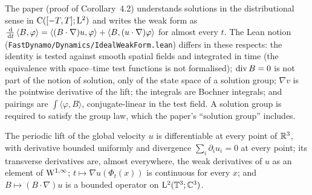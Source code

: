 The paper (proof of Corollary~4.2) understands solutions in the distributional sense in
$\mathrm{C}([-T,T];\mathrm{L}^2)$ and writes the weak form as
$\frac{\,\mathrm{d}}{\,\mathrm{d} t}\left\langle B,\varphi\right\rangle=\left\langle(B\cdot\nabla)u,\varphi\right\rangle+\left\langle B,(u\cdot\nabla)\varphi\right\rangle$
for almost every $t$.  The Lean notion (\texttt{FastDynamo/Dynamics/IdealWeakForm.lean})
differs in these respects: the identity is tested against smooth spatial fields and integrated
in time (the equivalence with space--time test functions is not formalised); $\operatorname{div} B=0$ is
not part of the notion of solution, only of the state space of a solution group; $\nabla v$
is the pointwise derivative of the lift; the integrals are Bochner integrals; and pairings are
$\int\langle\varphi,B\rangle$, conjugate-linear in the test field.  A solution group is
required to satisfy the group law, which the paper's ``solution group'' includes.

\begin{lemma}
  \label{lem:dynamics:velocity-gradient}
  \leanok
  The periodic lift of the global velocity $u$ is differentiable at every point of $\mathbb{R}^3$,
  with derivative bounded uniformly and divergence $\sum_i\partial_iu_i=0$ at every point; its
  transverse derivatives are, almost everywhere, the weak derivatives of $u$ as an element of
  $\mathrm{W}^{1,\infty}$; $t\mapsto\nabla u(\Phi_t(x))$ is continuous for every $x$; and
  $B\mapsto(B\cdot\nabla)u$ is a bounded operator on $\mathrm{L}^2(\mathbb{T}^3;\mathbb{C}^3)$.
\end{lemma}

